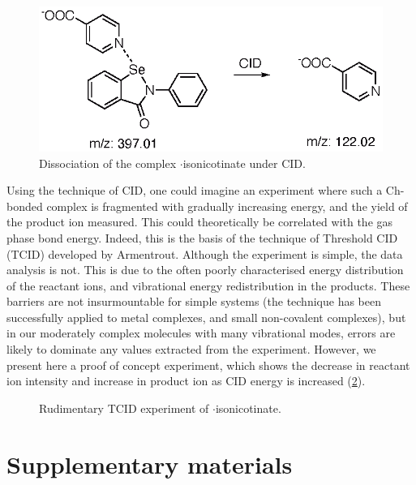\begin{refsection}
\begin{figure}
    \centering
    \includegraphics[scale=0.8]{Figures/neg-esi-ms.eps}
    \caption[Negative mode ESI of $\cdot$isonicotinate]{Dissociation of the complex $\cdot$isonicotinate under CID.}
    \label{fig:neg-esi-ms}
\end{figure}

Using the technique of CID, one could imagine an experiment where such a Ch-bonded complex is fragmented with gradually increasing energy, and the yield of the product ion measured.
This could theoretically be correlated with the gas phase bond energy.
Indeed, this is the basis of the technique of Threshold CID (TCID) developed by Armentrout.\autocite{Armentrout2003,Rodgers2000,Narancic2007}
Although the experiment is simple, the data analysis is not.
This is due to the often poorly characterised energy distribution of the reactant ions, and vibrational energy redistribution in the products.
These barriers are not insurmountable for simple systems (the technique has been successfully applied to metal complexes, and small non-covalent complexes), but in our moderately complex molecules with many vibrational modes, errors are likely to dominate any values extracted from the experiment.
However, we present here a proof of concept experiment, which shows the decrease in reactant ion intensity and increase in product ion as CID energy is increased (\ref{fig:ebs-tcid}).

\begin{figure}
    \centering
    \caption[TCID experiment of $\cdot$isonicotinate]{Rudimentary TCID experiment of $\cdot$isonicotinate.}
    \label{fig:ebs-tcid}
\end{figure}

\section{Supplementary materials}



\end{refsection}
